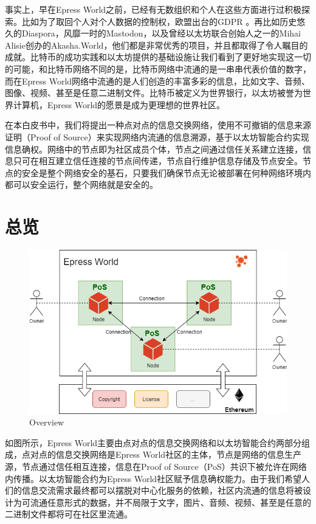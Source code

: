 \documentclass[12pt,a4paper]{extarticle}
\begin{document}
    事实上，早在Epress World之前，已经有无数组织和个人在这些方面进行过积极探索。比如为了取回个人对个人数据的控制权，欧盟出台的GDPR
    \cite{gdpr}。再比如历史悠久的Diaspora\cite{diaspora}，风靡一时的Mastodon\cite{mastodon}，以及曾经以太坊联合创始人之一的Mihai Alisie创办的Akasha.World\cite{akasha}，他们都是非常优秀的项目，并且都取得了令人瞩目的成就。比特币\cite{bitcoin}的成功实践和以太坊\cite{ethereum}提供的基础设施让我们看到了更好地实现这一切的可能，和比特币\cite{bitcoin}网络不同的是，比特币网络中流通的是一串串代表价值的数字，而在Epress World网络中流通的是人们创造的丰富多彩的信息，比如文字、音频、图像、视频、甚至是任意二进制文件。比特币被定义为世界银行，以太坊被誉为世界计算机，Epress World的愿景是成为更理想的世界社区。

    在本白皮书中，我们将提出一种点对点的信息交换网络，使用不可撤销的信息来源证明（Proof of Source）来实现网络内流通的信息溯源，基于以太坊智能合约实现信息确权。网络中的节点即为社区成员个体，节点之间通过信任关系建立连接，信息只可在相互建立信任连接的节点间传递，节点自行维护信息存储及节点安全。节点的安全是整个网络安全的基石，只要我们确保节点无论被部署在何种网络环境内都可以安全运行，整个网络就是安全的。
\section{总览}
    \begin{figure}[H]
        \centering
        \includegraphics[width=\textwidth]{figures-overview.png}
        \caption{Overview}
    \end{figure}
    如图所示，Epress World主要由点对点的信息交换网络和以太坊智能合约两部分组成，点对点的信息交换网络是Epress World社区的主体，节点是网络的信息生产源，节点通过信任相互连接，信息在Proof of Source（PoS）共识下被允许在网络内传播。以太坊智能合约为Epress World社区赋予信息确权能力。由于我们希望人们的信息交流需求最终都可以摆脱对中心化服务的依赖，社区内流通的信息将被设计为可流通任意形式的数据，并不局限于文字，图片、音频、视频、甚至是任意的二进制文件都将可在社区里流通。
\end{document}
